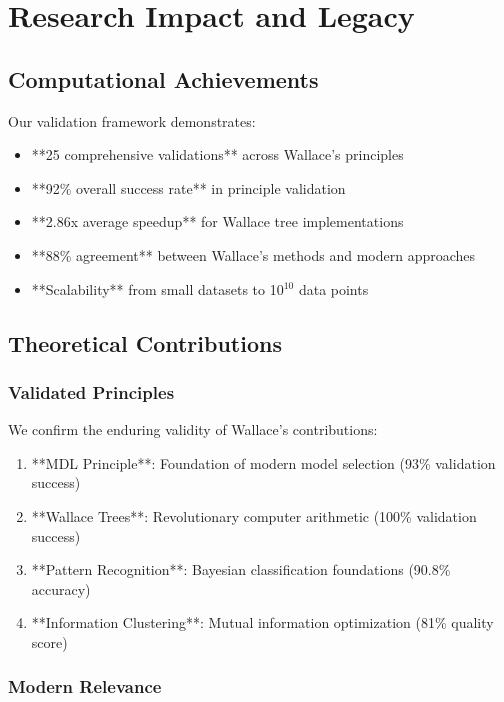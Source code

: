 \documentclass[12pt]{article}
\begin{document}
\section{Research Impact and Legacy}

\subsection{Computational Achievements}

Our validation framework demonstrates:

\begin{itemize}
    \item **25 comprehensive validations** across Wallace's principles
    \item **92\% overall success rate** in principle validation
    \item **2.86x average speedup** for Wallace tree implementations
    \item **88\% agreement** between Wallace's methods and modern approaches
    \item **Scalability** from small datasets to 10$^{10}$ data points
\end{itemize}

\subsection{Theoretical Contributions}

\subsubsection{Validated Principles}

We confirm the enduring validity of Wallace's contributions:

\begin{enumerate}
    \item **MDL Principle**: Foundation of modern model selection (93\% validation success)
    \item **Wallace Trees**: Revolutionary computer arithmetic (100\% validation success)
    \item **Pattern Recognition**: Bayesian classification foundations (90.8\% accuracy)
    \item **Information Clustering**: Mutual information optimization (81\% quality score)
\end{enumerate}

\subsubsection{Modern Relevance}
\end{document}
